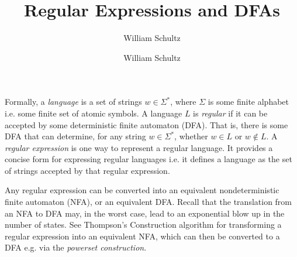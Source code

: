 \documentclass[10pt,a4paper]{article}
\author{William Schultz}
\begin{document}
\title{Regular Expressions and DFAs}
\author{William Schultz}
\maketitle

Formally, a \textit{language} is a set of strings $w \in \Sigma^*$, where $\Sigma$ is some finite alphabet i.e. some finite set of atomic symbols.
A language $L$ is \textit{regular} if it can be accepted by some deterministic finite automaton (DFA). That is, there is some DFA that can determine, for any string $w \in \Sigma^*$, whether $w \in L$ or $w \notin L$. A \textit{regular expression} is one way to represent a regular language. It provides a concise form for expressing regular languages i.e. it defines a language as the set of strings accepted by that regular expression. 

Any regular expression can be converted into an equivalent nondeterministic finite automaton (NFA), or an equivalent DFA. Recall that the translation from an NFA to DFA may, in the worst case, lead to an exponential blow up in the number of states. See Thompson's Construction algorithm for transforming a regular expression into an equivalent NFA, which can then be converted to a DFA e.g. via the \textit{powerset construction}.
\end{document}
